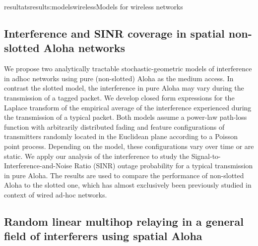 \documentclass{ra2016}
\begin{document}
\begin{module}{resultats}{results:modelswireless}{Models for wireless networks}

\subsection{Interference and SINR coverage in spatial non-slotted Aloha networks}

\begin{participants}
\end{participants}


We propose two analytically tractable stochastic-geometric models of interference in adhoc
networks using pure (non-slotted) Aloha as the medium access. In contrast the slotted model, the interference in
pure Aloha may vary during the transmission of a tagged
packet. We develop closed form expressions for the Laplace
transform of the empirical average of the interference
experienced during the transmission of a typical packet.
Both models assume a power-law path-loss function with
arbitrarily distributed fading and feature configurations
of transmitters randomly located in the Euclidean plane
according to a Poisson point process. Depending on the
model, these configurations vary over time or are static. We
apply our analysis of the interference to study the Signal-to-
Interference-and-Noise Ratio (SINR) outage probability for
a typical transmission in pure Aloha. The results are used
to compare the performance of non-slotted Aloha to the
slotted one, which has almost exclusively been previously
studied in context of wired ad-hoc networks.


\subsection{Random linear multihop relaying in a general field of interferers using spatial Aloha }

\begin{participants}
\end{participants}


\end{module}
\end{document}
